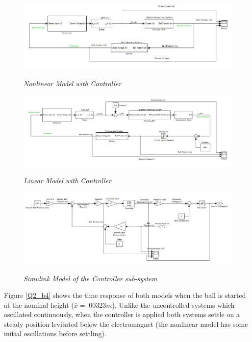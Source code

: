 \documentclass{article}
\theoremstyle{plain}
\theoremstyle{definition}
\theoremstyle{remark}
\begin{document}
\begin{figure}[h!]
\begin{center}
\includegraphics[width = 14cm]{NonLinearControlledComplete}
\caption{\emph{Nonlinear Model with Controller}}
\label{Q2_b1}
\includegraphics[width = 14cm]{LinearControlledComplete}
\caption{\emph{Linear Model with Controller}}
\label{Q2_b2}
\includegraphics[width = 14cm]{Controller}
\caption{\emph{Simulink Model of the Controller sub-system}}
\label{Q2_b3}
\end{center}
\end{figure}

Figure \ref{Q2_b4} shows the time response of both models when the ball is started at the nominal height ($\bar{x} = .00323m$). Unlike the uncontrolled systems which oscillated continuously, when the controller is applied both systems settle on a steady position levitated below the electromagnet (the nonlinear model has some initial oscillations before settling).\\
\end{document}
